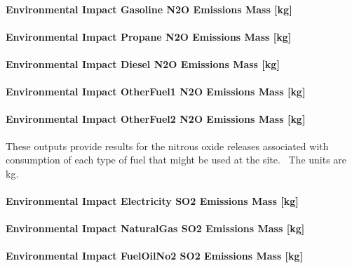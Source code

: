 \paragraph{Environmental Impact Gasoline N2O Emissions Mass {[}kg{]}}\label{environmental-impact-gasoline-n2o-emissions-mass-kg}

\paragraph{Environmental Impact Propane N2O Emissions Mass {[}kg{]}}\label{environmental-impact-propane-n2o-emissions-mass-kg}

\paragraph{Environmental Impact Diesel N2O Emissions Mass {[}kg{]}}\label{environmental-impact-diesel-n2o-emissions-mass-kg}

\paragraph{Environmental Impact OtherFuel1 N2O Emissions Mass {[}kg{]}}\label{environmental-impact-otherfuel1-n2o-emissions-mass-kg}

\paragraph{Environmental Impact OtherFuel2 N2O Emissions Mass {[}kg{]}}\label{environmental-impact-otherfuel2-n2o-emissions-mass-kg}

These outputs provide results for the nitrous oxide releases associated with consumption of each type of fuel that might be used at the site.~ The units are kg.

\paragraph{Environmental Impact Electricity SO2 Emissions Mass {[}kg{]}}\label{environmental-impact-electricity-so2-emissions-mass-kg}

\paragraph{Environmental Impact NaturalGas SO2 Emissions Mass {[}kg{]}}\label{environmental-impact-natural-gas-so2-emissions-mass-kg}

\paragraph{Environmental Impact FuelOilNo2 SO2 Emissions Mass {[}kg{]}}\label{environmental-impact-fuel-oil-2-so2-emissions-mass-kg}

